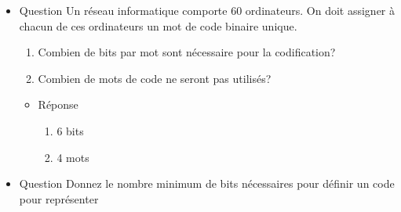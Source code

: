 \documentclass[letter, oneside]{book}
\begin{document}
\begin{itemize}
\begin{itemize}
\begin{enumerate}
\item \begin{center}

\end{center}

\item \begin{center}

\end{center}

\item \begin{center}

\end{center}

\item \begin{center}

\end{center}

\item \begin{center}

\end{center}
\end{enumerate}
\end{itemize}

\item Question
\label{sec:org2989828}
Un réseau informatique comporte 60 ordinateurs. On doit assigner à
chacun de ces ordinateurs un mot de code binaire unique.

\begin{enumerate}
\item Combien de bits par mot sont nécessaire pour la codification?

\item Combien de mots de code ne seront pas utilisés?
\end{enumerate}

\begin{itemize}
\item Réponse
\label{sec:orgac31592}
\begin{enumerate}
\item 6 bits

\item 4 mots
\end{enumerate}
\end{itemize}

\item Question
\label{sec:org8dd2f31}
Donnez le nombre minimum de bits nécessaires pour définir un code pour représenter


\end{itemize}
\end{document}
